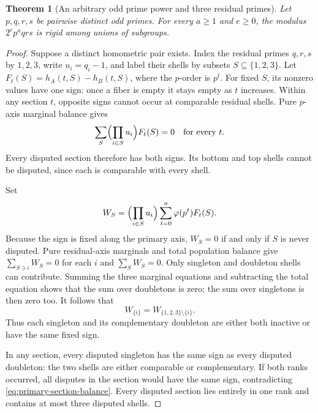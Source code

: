 \documentclass[11pt]{article}
\numberwithin{equation}{section}
\newtheorem{theorem}{Theorem}[section]
\theoremstyle{definition}
\theoremstyle{remark}
\begin{document}
\begin{theorem}[An arbitrary odd prime power and three residual primes]
\label{thm:primary-power-four-primes}
Let \(p,q,r,s\) be pairwise distinct odd primes. For every
\(a\ge1\) and \(e\ge0\), the modulus \(2^ep^aqrs\) is rigid
among unions of subgroups.
\end{theorem}

\begin{proof}
Suppose a distinct homometric pair exists. Index the residual primes
\(q,r,s\) by \(1,2,3\), write \(u_i=q_i-1\), and label their
shells by subsets \(S\subseteq\{1,2,3\}\). Let
\(F_t(S)=h_A(t,S)-h_B(t,S)\), where the \(p\)-order is \(p^t\).
For fixed \(S\), its nonzero values have one sign: once a fiber is
empty it stays empty as \(t\) increases. Within any section \(t\),
opposite signs cannot occur at comparable residual shells.
Pure \(p\)-axis marginal balance gives
\begin{equation}
\sum_S\Bigl(\prod_{i\in S}u_i\Bigr)F_t(S)=0
\quad\hbox{for every }t.
\label{eq:primary-section-balance}
\end{equation}
Every disputed section therefore has both signs. Its bottom and top
shells cannot be disputed, since each is comparable with every shell.

Set
\[
W_S=\Bigl(\prod_{i\in S}u_i\Bigr)
       \sum_{t=0}^a\varphi(p^t)F_t(S).
\]
Because the sign is fixed along the primary axis, \(W_S=0\) if and
only if \(S\) is never disputed. Pure residual-axis marginals and
total population balance give
\(\sum_{S\ni i}W_S=0\) for each \(i\) and \(\sum_SW_S=0\).
Only singleton and doubleton shells can contribute. Summing the three
marginal equations and subtracting the total equation shows that the
sum over doubletons is zero; the sum over singletons is then zero too.
It follows that
\begin{equation}
W_{\{i\}}=W_{\{1,2,3\}\setminus\{i\}}.
\label{eq:primary-complementary-signs}
\end{equation}
Thus each singleton and its complementary doubleton are either both
inactive or have the same fixed sign.

In any section, every disputed singleton has the same sign as every
disputed doubleton: the two shells are either comparable or
complementary. If both ranks occurred, all disputes in the section
would have the same sign, contradicting
\eqref{eq:primary-section-balance}. Every disputed section lies
entirely in one rank and contains at most three disputed shells.


\end{proof}
\end{document}
